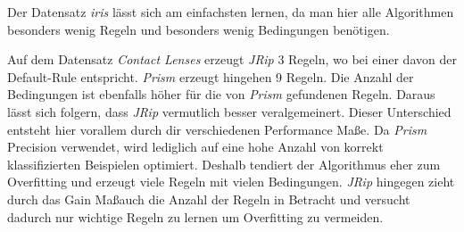Der Datensatz \emph{iris} l\"asst sich am einfachsten lernen, da man hier alle Algorithmen besonders wenig Regeln und besonders wenig Bedingungen ben\"otigen.

Auf dem Datensatz \emph{Contact Lenses} erzeugt \emph{JRip} 3 Regeln, wo bei einer davon der Default-Rule entspricht. \emph{Prism} erzeugt hingehen 9 Regeln. Die Anzahl der Bedingungen ist ebenfalls h\"oher f\"ur die von \emph{Prism} gefundenen Regeln. Daraus l\"asst sich folgern, dass \emph{JRip} vermutlich besser veralgemeinert. 
Dieser Unterschied entsteht hier vorallem durch dir verschiedenen Performance Ma\ss e. Da \emph{Prism} Precision verwendet, wird lediglich auf eine hohe Anzahl von korrekt klassifizierten Beispielen optimiert. Deshalb tendiert der Algorithmus eher zum Overfitting und erzeugt viele Regeln mit vielen Bedingungen. \emph{JRip} hingegen zieht durch das Gain Ma\ss auch die Anzahl der Regeln in Betracht und versucht dadurch nur wichtige Regeln zu lernen um Overfitting zu vermeiden.
